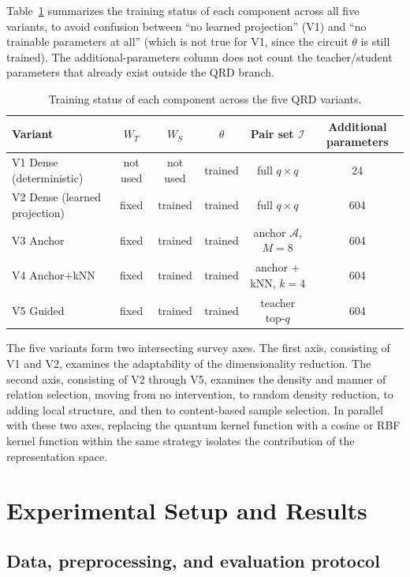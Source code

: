 Table~\ref{tab:bienthe_cauhinh} summarizes the training status of
each component across all five variants, to avoid confusion between
``no learned projection'' (V1) and ``no trainable parameters at
all'' (which is not true for V1, since the circuit $\theta$ is still
trained). The additional-parameters column does not count the
teacher/student parameters that already exist outside the QRD
branch.

\begin{table}[!htbp]
\centering
\caption{Training status of each component across the five QRD variants.}
\label{tab:bienthe_cauhinh}
\small
\begin{tabular}{lccccc}
\toprule
\textbf{Variant} & $W_T$ & $W_S$ & $\theta$ & Pair set $\mathcal{I}$ & Additional parameters \\
\midrule
V1 Dense (deterministic) & not used & not used & trained & full $q\times q$ & 24 \\
V2 Dense (learned projection) & fixed & trained & trained & full $q\times q$ & 604 \\
V3 Anchor & fixed & trained & trained & anchor $\mathcal{A}$, $M{=}8$ & 604 \\
V4 Anchor$+$kNN & fixed & trained & trained & anchor $+$ kNN, $k{=}4$ & 604 \\
V5 Guided & fixed & trained & trained & teacher top-$q$ & 604 \\
\bottomrule
\end{tabular}
\end{table}
\FloatBarrier

The five variants form two intersecting survey axes. The first axis,
consisting of V1 and V2, examines the adaptability of the
dimensionality reduction. The second axis, consisting of V2 through
V5, examines the density and manner of relation selection, moving
from no intervention, to random density reduction, to adding local
structure, and then to content-based sample selection. In parallel
with these two axes, replacing the quantum kernel function with a
cosine or RBF kernel function within the same strategy isolates the
contribution of the representation space.

\section{Experimental Setup and Results}
\label{sec:thucnghiem}

\subsection{Data, preprocessing, and evaluation protocol}
\label{sec:dulieu}


